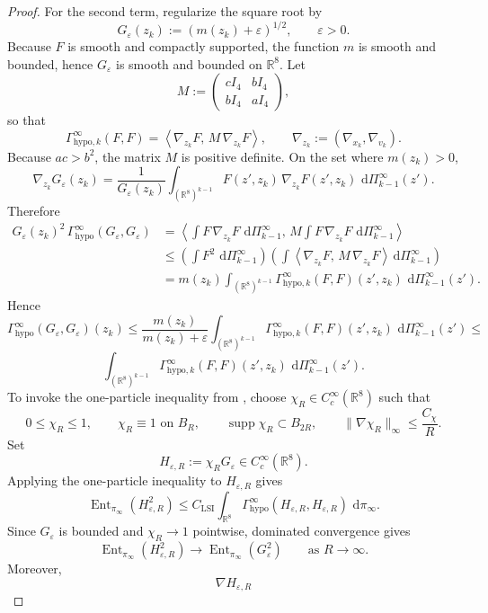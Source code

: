 \documentclass[11pt]{article}
\theoremstyle{remark}
\newcommand{\R}{\mathbb R}
\newcommand{\dd}{\,\mathrm d}
\newcommand{\Ent}{\operatorname{Ent}}
\begin{document}
\begin{proof}
For the second term, regularize the square root by
\[
G_\varepsilon(z_k):=(m(z_k)+\varepsilon)^{1/2},
\qquad \varepsilon>0.
\]
Because $F$ is smooth and compactly supported, the function $m$ is smooth and
bounded, hence $G_\varepsilon$ is smooth and bounded on $\R^8$.  Let
\[
M:=
\begin{pmatrix}
cI_4 & bI_4\\
bI_4 & aI_4
\end{pmatrix},
\]
so that
\[
\Gamma_{\mathrm{hypo},k}^\infty(F,F)
=
\left\langle \nabla_{z_k}F,\,
M\,\nabla_{z_k}F\right\rangle,
\qquad
\nabla_{z_k}:=(\nabla_{x_k},\nabla_{v_k}).
\]
Because $ac>b^2$, the matrix $M$ is positive definite.  On the set where
$m(z_k)>0$,
\[
\nabla_{z_k}G_\varepsilon(z_k)
=
\frac{1}{G_\varepsilon(z_k)}
\int_{(\R^8)^{k-1}}F(z',z_k)\,\nabla_{z_k}F(z',z_k)\,\dd\Pi_{k-1}^\infty(z').
\]
Therefore
\begin{align*}
G_\varepsilon(z_k)^2\,\Gamma_{\mathrm{hypo}}^\infty(G_\varepsilon,G_\varepsilon)
&=
\left\langle
\int F\,\nabla_{z_k}F\,\dd\Pi_{k-1}^\infty,\,
M
\int F\,\nabla_{z_k}F\,\dd\Pi_{k-1}^\infty
\right\rangle\\
&\le
\left(\int F^2\,\dd\Pi_{k-1}^\infty\right)
\left(
\int
\left\langle \nabla_{z_k}F,\,
M\,\nabla_{z_k}F\right\rangle
\dd\Pi_{k-1}^\infty
\right)\\
&=
m(z_k)
\int_{(\R^8)^{k-1}}
\Gamma_{\mathrm{hypo},k}^\infty(F,F)(z',z_k)\,
\dd\Pi_{k-1}^\infty(z').
\end{align*}
Hence
\[
\Gamma_{\mathrm{hypo}}^\infty(G_\varepsilon,G_\varepsilon)(z_k)
\le
\frac{m(z_k)}{m(z_k)+\varepsilon}
\int_{(\R^8)^{k-1}}
\Gamma_{\mathrm{hypo},k}^\infty(F,F)(z',z_k)\,
\dd\Pi_{k-1}^\infty(z')
\le
\]
\[
\int_{(\R^8)^{k-1}}
\Gamma_{\mathrm{hypo},k}^\infty(F,F)(z',z_k)\,
\dd\Pi_{k-1}^\infty(z').
\]
To invoke the one-particle inequality from \cite{convergence}, choose
$\chi_R\in C_c^\infty(\R^8)$ such that
\[
0\le \chi_R\le 1,\qquad
\chi_R\equiv 1\text{ on }B_R,\qquad
\operatorname{supp}\chi_R\subset B_{2R},\qquad
\|\nabla \chi_R\|_\infty\le \frac{C_\chi}{R}.
\]
Set
\[
H_{\varepsilon,R}:=\chi_R G_\varepsilon\in C_c^\infty(\R^8).
\]
Applying the one-particle inequality to $H_{\varepsilon,R}$ gives
\[
\Ent_{\pi_\infty}(H_{\varepsilon,R}^2)
\le
C_{\mathrm{LSI}}
\int_{\R^8}\Gamma_{\mathrm{hypo}}^\infty(H_{\varepsilon,R},H_{\varepsilon,R})\,
\dd\pi_\infty.
\]
Since $G_\varepsilon$ is bounded and $\chi_R\to 1$ pointwise, dominated
convergence gives
\[
\Ent_{\pi_\infty}(H_{\varepsilon,R}^2)\to \Ent_{\pi_\infty}(G_\varepsilon^2)
\qquad\text{as }R\to\infty.
\]
Moreover,
\[
\nabla H_{\varepsilon,R}
\]
\end{proof}
\end{document}
